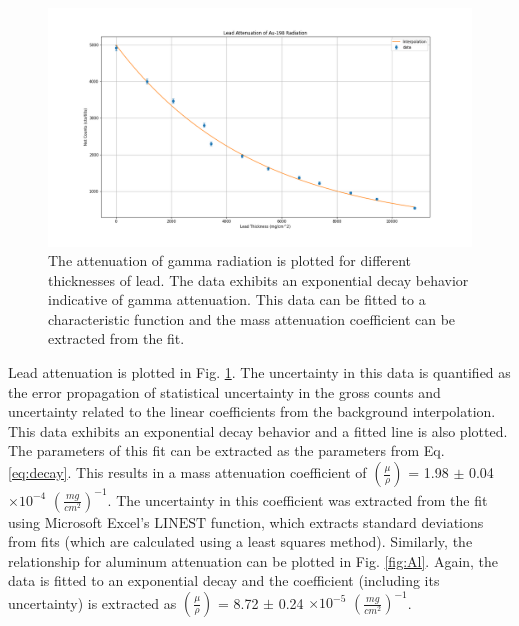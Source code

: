 \begin{figure}
\centering
\includegraphics[width=\textwidth]{Pb.png}
\caption{The attenuation of gamma radiation is plotted for different thicknesses of lead. The data exhibits an exponential decay behavior indicative of gamma attenuation. This data can be fitted to a characteristic function and the mass attenuation coefficient can be extracted from the fit.}
\label{fig:Pb}
\end{figure}

Lead attenuation is plotted in Fig. \ref{fig:Pb}. The uncertainty in this data is quantified as the error propagation of statistical uncertainty in the gross counts and uncertainty related to the linear coefficients from the background interpolation. This data exhibits an exponential decay behavior and a fitted line is also plotted. The parameters of this fit can be extracted as the parameters from Eq. \ref{eq:decay}. This results in a mass attenuation coefficient of $(\frac{\mu}{\rho})$ = 1.98 $\pm$ 0.04 $\times 10^{-4}$ $(\frac{mg}{cm^2})^{-1}$. The uncertainty in this coefficient was extracted from the fit using Microsoft Excel’s $\mathrm{LINEST}$ function, which extracts standard deviations from fits (which are calculated using a least squares method). Similarly, the relationship for aluminum attenuation can be plotted in Fig. \ref{fig:Al}. Again, the data is fitted to an exponential decay and the coefficient (including its uncertainty) is extracted as $(\frac{\mu}{\rho})$ = 8.72 $\pm$ 0.24 $\times 10^{-5}$ $(\frac{mg}{cm^2})^{-1}$.

